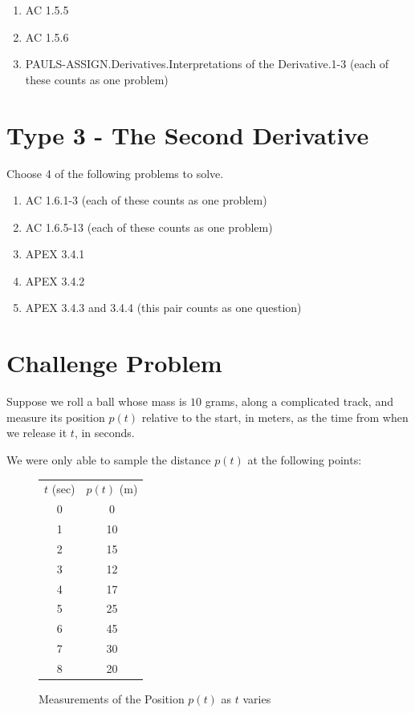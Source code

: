 \documentclass[12pt]{article}
\begin{document}
\begin{enumerate}
  \item AC 1.5.5
  \item AC 1.5.6
  \item PAULS-ASSIGN.Derivatives.Interpretations of the Derivative.1-3 (each of these counts as one problem)
\end{enumerate}

\section{Type 3 - The Second Derivative}
Choose 4 of the following problems to solve.

\begin{enumerate}
  \item AC 1.6.1-3 (each of these counts as one problem)
  \item AC 1.6.5-13 (each of these counts as one problem)
  \item APEX 3.4.1
  \item APEX 3.4.2
  \item APEX 3.4.3 and 3.4.4 (this pair counts as one question)
\end{enumerate}

\section{Challenge Problem}

Suppose we roll a ball whose mass is $10$ grams, 
along a complicated track,
and measure its position $p(t)$ relative to the start, in meters,
as the time from when we release it $t$, in seconds.

We were only able to sample the distance $p(t)$ at the following points:
\begin{figure}[H]
  \centering
  \begin{tabular}{|c|c|}
    \hline
    $t$ (sec) & $p(t)$ (m) \\
    0 & 0 \\
    1 & 10 \\
    2 & 15 \\
    3 & 12 \\
    4 & 17 \\
    5 & 25 \\
    6 & 45 \\
    7 & 30 \\
    8 & 20 \\
    \hline
  \end{tabular}
  \caption{Measurements of the Position $p(t)$ as $t$ varies}
\end{figure}
\end{document}
